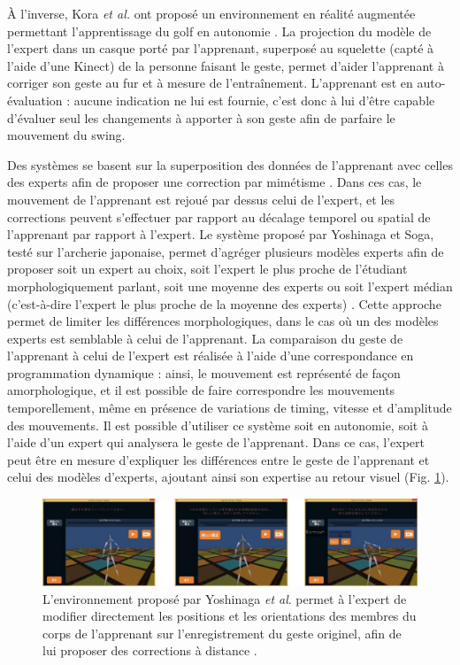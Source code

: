 À l'inverse, Kora \textit{et al.} ont proposé un environnement en réalité augmentée permettant l'apprentissage du golf en autonomie \parencite{Kora20151559}. La projection du modèle de l'expert dans un casque porté par l'apprenant, superposé au squelette (capté à l'aide d'une Kinect) de la personne faisant le geste, permet d'aider l'apprenant à corriger son geste au fur et à mesure de l'entraînement. L'apprenant est en auto-évaluation : aucune indication ne lui est fournie, c'est donc à lui d'être capable d'évaluer seul les changements à apporter à son geste afin de parfaire le mouvement du swing.

Des systèmes se basent sur la superposition des données de l'apprenant avec celles des experts afin de proposer une correction par mimétisme \parencite{Yoshinaga2015Doa}. Dans ces cas, le mouvement de l'apprenant est rejoué par dessus celui de l'expert, et les corrections peuvent s'effectuer par rapport au décalage temporel ou spatial de l'apprenant par rapport à l'expert.
Le système proposé par Yoshinaga et Soga, testé sur l'archerie japonaise, permet d'agréger plusieurs modèles experts afin de proposer soit un expert au choix, soit l'expert le plus proche de l'étudiant morphologiquement parlant, soit une moyenne des experts ou soit l'expert médian (c'est-à-dire l'expert le plus proche de la moyenne des experts) \parencite{Yoshinaga2015Doa}. Cette approche permet de limiter les différences morphologiques, dans le cas où un des modèles experts est semblable à celui de l'apprenant. La comparaison du geste de l'apprenant à celui de l'expert est réalisée à l'aide d'une correspondance en programmation dynamique : ainsi, le mouvement est représenté de façon amorphologique, et il est possible de faire correspondre les mouvements temporellement, même en présence de variations de timing, vitesse et d'amplitude des mouvements. Il est possible d'utiliser ce système soit en autonomie, soit à l'aide d'un expert qui analysera le geste de l'apprenant. Dans ce cas, l'expert peut être en mesure d'expliquer les différences entre le geste de l'apprenant et celui des modèles d'experts, ajoutant ainsi son expertise au retour visuel (Fig. \ref{fig:Yoshiniga_archery}).

\begin{figure}
    \centering
    \includegraphics[width=\textwidth]{pictures/Yoshiniga_archery.png}
    \caption[Correction du mouvement de l'apprenant \parencite{Yoshinaga2015Doa}]{L'environnement proposé par Yoshinaga \textit{et al}. permet à l'expert de modifier directement les positions et les orientations des membres du corps de l'apprenant sur l'enregistrement du geste originel, afin de lui proposer des corrections à distance \parencite{Yoshinaga2015Doa}.}
    \label{fig:Yoshiniga_archery}
\end{figure}



